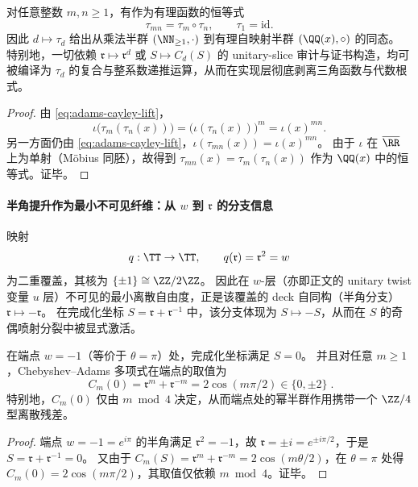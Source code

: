 \begin{corollary}[Chebyshev--Adams 的有理半群表示：\texorpdfstring{$\tau_{mn}=\tau_m\circ\tau_n$}{tau_mn=tau_m∘tau_n}]\label{cor:chebyshev-adams-rational-semigroup}
对任意整数 \(m,n\ge 1\)，有作为有理函数的恒等式
\[
\tau_{mn}=\tau_m\circ\tau_n,
\qquad
\tau_1=\mathrm{id}.
\]
因此 \(d\mapsto\tau_d\) 给出从乘法半群 \((\NN_{\ge 1},\cdot)\) 到有理自映射半群 \((\QQ(x),\circ)\) 的同态。
特别地，一切依赖 \(\mathfrak r\mapsto \mathfrak r^d\) 或 \(S\mapsto C_d(S)\) 的 unitary-slice 审计与证书构造，均可被编译为 \(\tau_d\) 的复合与整系数递推运算，从而在实现层彻底剥离三角函数与代数根式。
\end{corollary}
\begin{proof}
由 \eqref{eq:adams-cayley-lift}，
\[
\iota\!\bigl(\tau_m(\tau_n(x))\bigr)
=\bigl(\iota(\tau_n(x))\bigr)^m
=\iota(x)^{mn}.
\]
另一方面仍由 \eqref{eq:adams-cayley-lift}，\(\iota(\tau_{mn}(x))=\iota(x)^{mn}\)。
由于 \(\iota\) 在 \(\overline{\RR}\) 上为单射（M\"obius 同胚），故得到 \(\tau_{mn}(x)=\tau_m(\tau_n(x))\) 作为 \(\QQ(x)\) 中的恒等式。证毕。
\end{proof}

\paragraph{半角提升作为最小不可见纤维：从 \(w\) 到 \(\mathfrak{r}\) 的分支信息}
映射
\[
q:\TT\to\TT,\qquad q(\mathfrak{r})=\mathfrak{r}^{2}=w
\]
为二重覆盖，其核为 \(\{\pm 1\}\cong \ZZ/2\ZZ\)。
因此在 \(w\)-层（亦即正文的 unitary twist 变量 \(u\) 层）不可见的最小离散自由度，正是该覆盖的 deck 自同构（半角分支）\(\mathfrak{r}\mapsto-\mathfrak{r}\)。
在完成化坐标 \(S=\mathfrak{r}+\mathfrak{r}^{-1}\) 中，该分支体现为
\(
S\mapsto -S
\)，从而在 \(S\) 的奇偶喷射分裂中被显式激活。

\begin{proposition}[端点 \texorpdfstring{$w=-1$}{w=-1} 的半角残差与 \texorpdfstring{$\ZZ/4$}{Z/4} 型取值]\label{prop:half-angle-z4-residue}
在端点 \(w=-1\)（等价于 \(\theta=\pi\)）处，完成化坐标满足 \(S=0\)。
并且对任意 \(m\ge 1\)，Chebyshev--Adams 多项式在端点的取值为
\begin{equation}\label{eq:chebyshev-endpoint-values}
\boxed{\;
C_m(0)=\mathfrak{r}^{m}+\mathfrak{r}^{-m}=2\cos(m\pi/2)\in\{0,\pm 2\}\; }.
\end{equation}
特别地，\(C_m(0)\) 仅由 \(m\bmod 4\) 决定，从而端点处的幂半群作用携带一个 \(\ZZ/4\) 型离散残差。
\end{proposition}
\begin{proof}
端点 \(w=-1=e^{i\pi}\) 的半角满足 \(\mathfrak{r}^{2}=-1\)，故 \(\mathfrak{r}=\pm i=e^{\pm i\pi/2}\)，于是 \(S=\mathfrak{r}+\mathfrak{r}^{-1}=0\)。
又由于 \(C_m(S)=\mathfrak{r}^m+\mathfrak{r}^{-m}=2\cos(m\theta/2)\)，在 \(\theta=\pi\) 处得
\(
C_m(0)=2\cos(m\pi/2)
\)，其取值仅依赖 \(m\bmod 4\)。证毕。
\end{proof}

